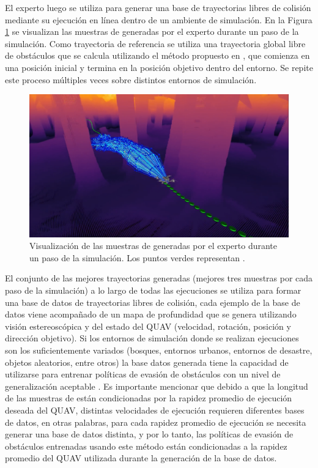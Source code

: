 El experto luego se utiliza para generar una base de trayectorias libres de colisión mediante su ejecución en línea dentro de un ambiente de simulación. En la Figura \ref{fig:prev-aoa-expert-sample} se visualizan las muestras de  generadas por el experto durante un paso de la simulación. Como trayectoria de referencia se utiliza una trayectoria global libre de obstáculos que se calcula utilizando el método propuesto en \cite{liu2018search}, que comienza en una posición inicial y termina en la posición objetivo dentro del entorno. Se repite este proceso múltiples veces sobre distintos entornos de simulación. 

\begin{figure}[H]
    \centering
    \includegraphics[scale=0.2]{partes/img/aoa-expert-sample.png}
    \caption[Visualización de las muestras de  generadas por el experto durante un paso de la simulación.]{Visualización de las muestras de  generadas por el experto durante un paso de la simulación. Los puntos verdes representan .}
    \label{fig:prev-aoa-expert-sample}
\end{figure}


El conjunto de las mejores trayectorias generadas (mejores tres muestras por cada paso de la simulación) a lo largo de todas las ejecuciones se utiliza para formar una base de datos de trayectorias libres de colisión, cada ejemplo de la base de datos viene acompañado de un mapa de profundidad que se genera utilizando visión estereoscópica y del estado del QUAV (velocidad, rotación, posición y dirección objetivo). Si los entornos de simulación donde se realizan ejecuciones son los suficientemente variados (bosques, entornos urbanos, entornos de desastre, objetos aleatorios, entre otros) la base datos generada tiene la capacidad de utilizarse para entrenar políticas de evasión de obstáculos con un nivel de generalización aceptable \cite{Loquercio2021}. Es importante mencionar que debido a que la longitud de las muestras de  están condicionadas por la rapidez promedio de ejecución deseada del QUAV, distintas velocidades de ejecución requieren diferentes bases de datos, en otras palabras, para cada rapidez promedio de ejecución se necesita generar una base de datos distinta, y por lo tanto, las políticas de evasión de obstáculos entrenadas usando este método están condicionadas a la rapidez promedio del QUAV utilizada durante la generación de la base de datos.

